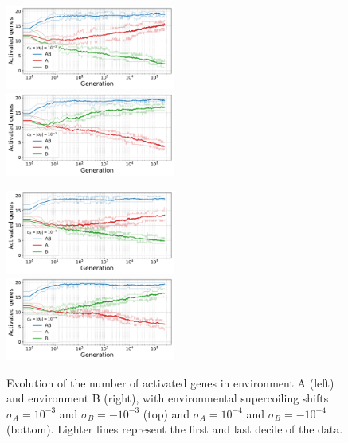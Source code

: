 \begin{figure}[H]
\centering
\includegraphics[width=0.495\textwidth]{param/sigma/sigma-1e-3/gene_activity_env_A.pdf}
\includegraphics[width=0.495\textwidth]{param/sigma/sigma-1e-3/gene_activity_env_B.pdf}

\includegraphics[width=0.495\textwidth]{param/sigma/sigma-1e-4/gene_activity_env_A.pdf}
\includegraphics[width=0.495\textwidth]{param/sigma/sigma-1e-4/gene_activity_env_B.pdf}
\caption[Evolution of the number of activated genes in each environment, with decreasing environmental supercoiling shifts]{Evolution of the number of activated genes in environment A (left) and environment B (right), with environmental supercoiling shifts $\sigma_A = 10^{-3}$ and $\sigma_B = -10^{-3}$ (top) and $\sigma_A = 10^{-4}$ and $\sigma_B = -10^{-4}$ (bottom).
Lighter lines represent the first and last decile of the data.}
\label{fig:param:sigma-activ-by-env}
\end{figure}

